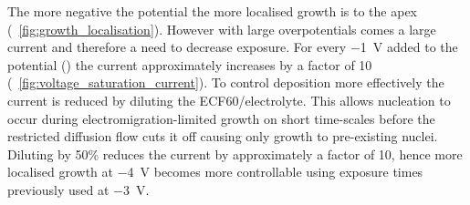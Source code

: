\documentclass{article}
\begin{document}
The more negative the potential the more localised growth is to the apex (\figurename~\ref{fig:growth_localisation}). However with large overpotentials comes a large current and therefore a need to decrease exposure. For every \SI{-1}{V} added to the potential () the current approximately  increases by a factor of 10 (\figurename~\ref{fig:voltage_saturation_current}). To control deposition more effectively the current is reduced by diluting the {\color{red}ECF60/electrolyte}. This allows nucleation to occur during electromigration-limited growth on short time-scales before the restricted diffusion flow cuts it off causing only growth to pre-existing nuclei. Diluting by 50\% reduces the current by approximately a factor of 10, hence more localised growth at \SI{-4}{V} becomes more controllable using exposure times previously used at \SI{-3}{V}.



\end{document}
